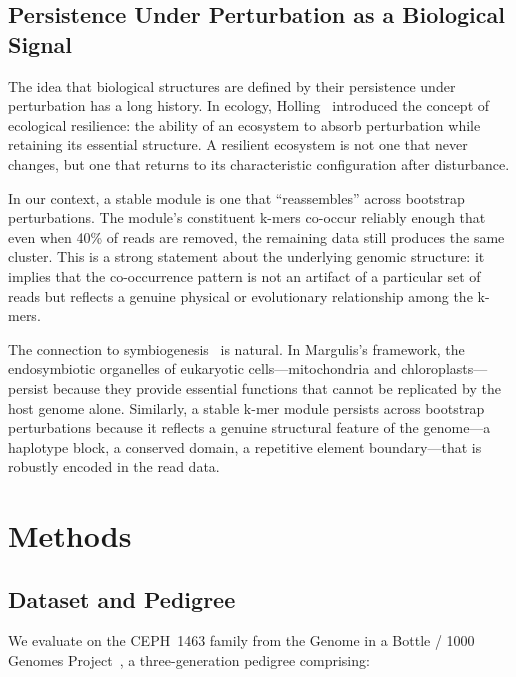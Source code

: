 \documentclass{../yalumba}
\begin{document}
\subsection{Persistence Under Perturbation as a Biological Signal}

The idea that biological structures are defined by their persistence under
perturbation has a long history.  In ecology, Holling~\cite{holling1973resilience}
introduced the concept of ecological resilience: the ability of an ecosystem to
absorb perturbation while retaining its essential structure.  A resilient
ecosystem is not one that never changes, but one that returns to its
characteristic configuration after disturbance.


In our context, a stable module is one that ``reassembles'' across bootstrap
perturbations.  The module's constituent k-mers co-occur reliably enough that
even when 40\% of reads are removed, the remaining data still produces the same
cluster.  This is a strong statement about the underlying genomic structure: it
implies that the co-occurrence pattern is not an artifact of a particular set of
reads but reflects a genuine physical or evolutionary relationship among the
k-mers.

The connection to symbiogenesis~\cite{margulis1998} is natural.  In Margulis's
framework, the endosymbiotic organelles of eukaryotic cells---mitochondria and
chloroplasts---persist because they provide essential functions that cannot be
replicated by the host genome alone.  Similarly, a stable k-mer module persists
across bootstrap perturbations because it reflects a genuine structural feature
of the genome---a haplotype block, a conserved domain, a repetitive element
boundary---that is robustly encoded in the read data.


\section{Methods}
\label{sec:methods}

\subsection{Dataset and Pedigree}

We evaluate on the CEPH~1463 family from the Genome in a Bottle / 1000
Genomes Project~\cite{ceph1463, zook2019giab, 1000genomes2015}, a
three-generation pedigree comprising:
\end{document}
